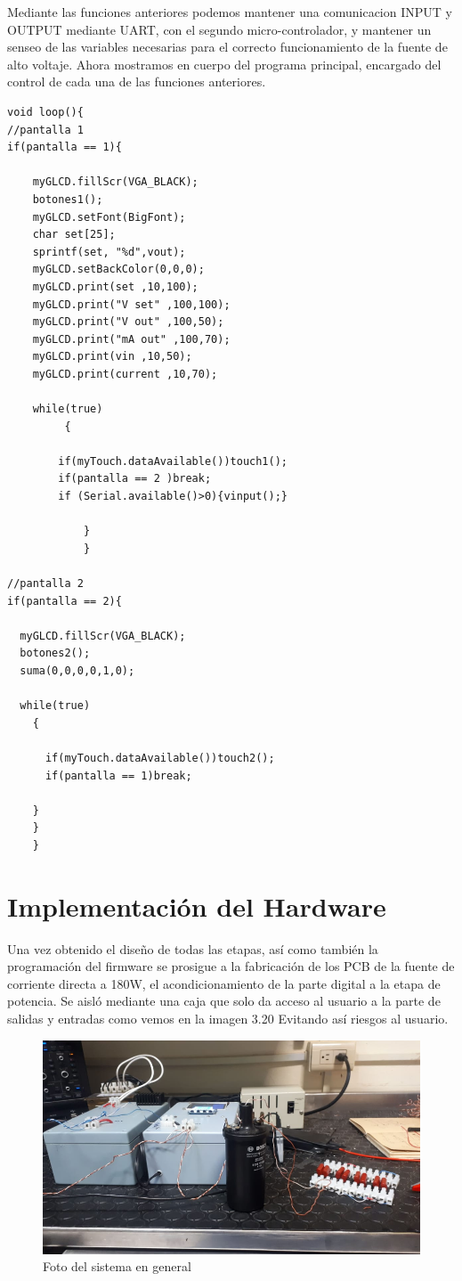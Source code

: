 Mediante las funciones anteriores podemos mantener una comunicacion INPUT y OUTPUT mediante UART, con el segundo micro-controlador, y mantener un senseo de las variables necesarias para el correcto funcionamiento de la fuente de alto voltaje. Ahora mostramos en cuerpo del programa principal, encargado del control de cada una de las funciones anteriores.

\begin{verbatim}
void loop(){
//pantalla 1
if(pantalla == 1){

    myGLCD.fillScr(VGA_BLACK);
    botones1();
    myGLCD.setFont(BigFont); 
    char set[25];
    sprintf(set, "%d",vout);
    myGLCD.setBackColor(0,0,0);
    myGLCD.print(set ,10,100);
    myGLCD.print("V set" ,100,100);
    myGLCD.print("V out" ,100,50);
    myGLCD.print("mA out" ,100,70);
    myGLCD.print(vin ,10,50);
    myGLCD.print(current ,10,70);
    
    while(true)
         {
         
        if(myTouch.dataAvailable())touch1();
        if(pantalla == 2 )break;
      	if (Serial.available()>0){vinput();}
      
            }
            }
        
//pantalla 2
if(pantalla == 2){

  myGLCD.fillScr(VGA_BLACK);
  botones2();
  suma(0,0,0,0,1,0);
  
  while(true)
    {
    
      if(myTouch.dataAvailable())touch2();
      if(pantalla == 1)break;
      
    }
    }
    }
\end{verbatim}
\newpage
\section{Implementación del Hardware}

Una vez obtenido el diseño de todas las etapas, así como también la programación del firmware se prosigue a la fabricación de los PCB de la fuente de corriente directa a 180W, el acondicionamiento de la parte digital a la etapa de potencia. Se aisló mediante una caja que solo da acceso al usuario a la parte de salidas y entradas como vemos en la imagen 3.20 Evitando así riesgos al usuario. \\


\begin{figure}[H]
\centering
\includegraphics[width=12cm]{Capitulo3/figs/noimagen.png}
\caption{Foto del sistema en general}
\end{figure}


